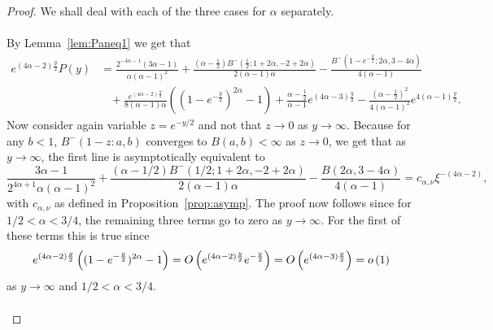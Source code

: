 \begin{proof}
We shall deal with each of the three cases for $\alpha$ separately.

\paragraph{}
By Lemma~\ref{lem:Paneq1} we get that
\begin{align*}
	e^{(4\alpha - 2)\frac{y}{2}}P(y) &= \frac{2^{-4 \alpha-1} (3 \alpha - 1)}{\alpha (\alpha - 1)^2} 
		+ \frac{(\alpha - \frac{1}{2} ) B^-(\frac{1}{2}; 1 + 2 \alpha, -2 + 2 \alpha)}{2(\alpha - 1) \alpha}
		- \frac{B^-(1-e^{-\frac{y}{2}}; 2\alpha, 3-4\alpha)}{4(\alpha - 1)} \\
	&\hspace{10pt}+ \frac{e^{(4\alpha - 2)\frac{y}{2}}}{8(\alpha-1)\alpha}\left((1 - e^{-\frac{y}{2}})^{2\alpha} - 1\right)
		+ \frac{\alpha-\frac{1}{2}}{\alpha-1} e^{(4\alpha-3)\frac{y}{2}}
		- \frac{(\alpha - \frac{1}{2})^2}{4(\alpha-1)^2} e^{4(\alpha-1)\frac{y}{2}}.
\end{align*}
Now consider again variable $z = e^{-y/2}$ and not that $z \to 0$ as $y \to \infty$. Because for any $b < 1$, $B^-(1-z: a,b)$ converges to $B(a,b) < \infty$ as $z \to 0$, we get that as $y \to \infty$, the first line is asymptotically equivalent to
\[
	\frac{3 \alpha - 1}{2^{4 \alpha+1} \alpha (\alpha - 1)^2} 
			+ \frac{(\alpha - 1/2 ) B^-(1/2; 1 + 2 \alpha, -2 + 2 \alpha)}{2(\alpha - 1) \alpha}
			- \frac{B(2\alpha, 3-4\alpha)}{4(\alpha - 1)} = c_{\alpha,\nu} \xi^{-(4\alpha - 2)},
\]
with $c_{\alpha,\nu}$ as defined in Proposition~\eqref{prop:asymp}. The proof now follows since for $1/2 < \alpha < 3/4$, the remaining three terms go to zero as $y \to \infty$. For the first of these terms this is true since 
\[
	e^{(4\alpha - 2)\frac{y}{2}}\left((1 - e^{-\frac{y}{2}})^{2\alpha} - 1\right) = O\left(e^{(4\alpha - 2)\frac{y}{2}}e^{-\frac{y}{2}}\right)
	= O\left(e^{(4\alpha - 3) \frac{y}{2}}\right) = o\left(1\right)
\]
as $y \to \infty$ and $1/2 < \alpha < 3/4$.

\paragraph{}


\end{proof}
